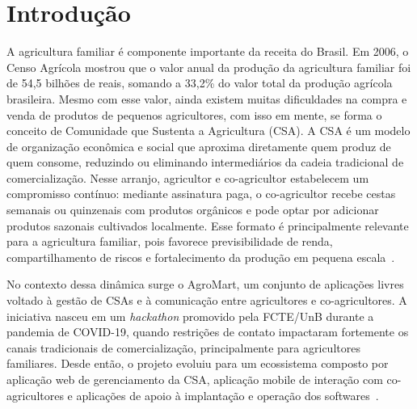 \chapter{Introdução}

A agricultura familiar é componente importante da receita do Brasil. Em 2006, o Censo Agrícola mostrou que o valor anual da produção da agricultura familiar foi de 54,5 bilhões de reais, somando a 33,2\% do valor total da produção agrícola brasileira.
Mesmo com esse valor, ainda existem muitas dificuldades na compra e venda de produtos de pequenos agricultores,
com isso em mente, se forma o conceito de Comunidade que Sustenta a Agricultura (CSA). A CSA é um modelo de organização econômica e social que aproxima diretamente quem produz de quem consome,
reduzindo ou eliminando intermediários da cadeia tradicional de comercialização. Nesse arranjo, agricultor e co-agricultor estabelecem um compromisso contínuo:
mediante assinatura paga, o co-agricultor recebe cestas semanais ou quinzenais com produtos orgânicos e pode optar por adicionar produtos sazonais cultivados localmente.
Esse formato é principalmente relevante para a agricultura familiar, pois favorece previsibilidade de renda, compartilhamento de riscos e fortalecimento da produção em pequena escala~\cite{redecsabrasil, silva2024contribuicao}.

No contexto dessa dinâmica surge o AgroMart, um conjunto de aplicações livres voltado à gestão de CSAs e à comunicação entre agricultores e co-agricultores.
A iniciativa nasceu em um \textit{hackathon} promovido pela FCTE/UnB durante a pandemia de COVID-19, quando restrições de contato impactaram fortemente os canais tradicionais de comercialização, principalmente para agricultores familiares.
Desde então, o projeto evoluiu para um ecossistema composto por aplicação web de gerenciamento da CSA,
aplicação mobile de interação com co-agricultores e aplicações de apoio à implantação e operação dos softwares~\cite{lucas2021agromart}.

